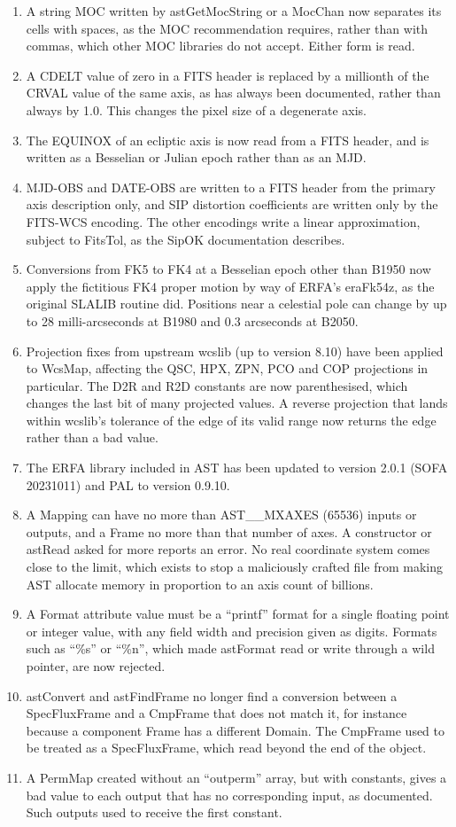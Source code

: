 \documentclass[twoside,11pt]{starlink}
\begin{document}
\begin{enumerate}
\item A string MOC written by astGetMocString or a MocChan now separates its cells with spaces, as the MOC recommendation requires, rather than with commas, which other MOC libraries do not accept.
  Either form is read.
\item A CDELT value of zero in a FITS header is replaced by a millionth of the CRVAL value of the same axis, as has always been documented, rather than always by 1.0.
  This changes the pixel size of a degenerate axis.
\item The EQUINOX of an ecliptic axis is now read from a FITS header, and is written as a Besselian or Julian epoch rather than as an MJD.
\item MJD-OBS and DATE-OBS are written to a FITS header from the primary axis description only, and SIP distortion coefficients are written only by the FITS-WCS encoding.
  The other encodings write a linear approximation, subject to FitsTol, as the SipOK documentation describes.
\item Conversions from FK5 to FK4 at a Besselian epoch other than B1950 now apply the fictitious FK4 proper motion by way of ERFA's eraFk54z, as the original SLALIB routine did.
  Positions near a celestial pole can change by up to 28 milli-arcseconds at B1980 and 0.3 arcseconds at B2050.
\item Projection fixes from upstream wcslib (up to version 8.10) have been applied to WcsMap, affecting the QSC, HPX, ZPN, PCO and COP projections in particular.
  The D2R and R2D constants are now parenthesised, which changes the last bit of many projected values.
  A reverse projection that lands within wcslib's tolerance of the edge of its valid range now returns the edge rather than a bad value.
\item The ERFA library included in AST has been updated to version 2.0.1 (SOFA 20231011) and PAL to version 0.9.10.
\item A Mapping can have no more than AST\_\_MXAXES (65536) inputs or outputs, and a Frame no more than that number of axes.
  A constructor or astRead asked for more reports an error.
  No real coordinate system comes close to the limit, which exists to stop a maliciously crafted file from making AST allocate memory in proportion to an axis count of billions.
\item A Format attribute value must be a ``printf'' format for a single floating point or integer value, with any field width and precision given as digits.
  Formats such as ``\%s'' or ``\%n'', which made astFormat read or write through a wild pointer, are now rejected.
\item astConvert and astFindFrame no longer find a conversion between a SpecFluxFrame and a CmpFrame that does not match it, for instance because a component Frame has a different Domain.
  The CmpFrame used to be treated as a SpecFluxFrame, which read beyond the end of the object.
\item A PermMap created without an ``outperm'' array, but with constants, gives a bad value to each output that has no corresponding input, as documented.
  Such outputs used to receive the first constant.
\end{enumerate}
\end{document}
